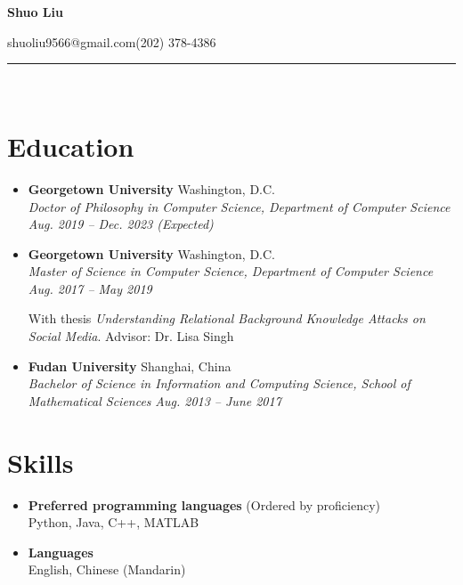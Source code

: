 \documentclass[letterpaper,11pt]{article}
\makeatletter
\newcommand{\resumeSubheading}[4]{
  \vspace{-7pt}\item
      \textbf{#1} \hfill #2 \\
      \textit{\small#3} \hfill \textit{\small #4}
  \vspace{-4pt}
}
\newcommand{\resumeSubheadingSmall}[2]{
  \vspace{-7pt}\item
      \textbf{#1} \hfill #2 \\
}
\newcommand{\resumeSubHeadingListStart}{\begin{itemize}[leftmargin=*]}
\newcommand{\resumeSubHeadingListEnd}{\end{itemize}}
\makeatother
\begin{document}
\begin{center}
\textbf{\huge Shuo Liu}

\vspace{5pt}
shuoliu9566@gmail.com\qquad (202) 378-4386

\date{\today}

\end{center}
\vspace{-15pt}
\noindent\rule{\textwidth}{1.5pt}\\
\vspace{-5pt}
\section{Education}
  \resumeSubHeadingListStart
    \resumeSubheading
      {Georgetown University}{Washington, D.C.}
      {Doctor of Philosophy in Computer Science\emph{, Department of Computer Science}}{Aug. 2019 -- Dec. 2023 (Expected)}
    \resumeSubheading
      {Georgetown University}{Washington, D.C.}
      {Master of Science in Computer Science\emph{, Department of Computer Science}}{Aug. 2017 -- May 2019}

      \begin{small}{With thesis \emph{Understanding Relational Background Knowledge Attacks on Social Media}. Advisor: Dr. Lisa Singh}\end{small}
    \resumeSubheading
      {Fudan University}{Shanghai, China}
      {Bachelor of Science in Information and Computing Science\emph{, School of Mathematical Sciences}}{Aug. 2013 -- June 2017}
  \resumeSubHeadingListEnd

\section{Skills}
  \resumeSubHeadingListStart
    \resumeSubheadingSmall
      {Preferred programming languages}{(Ordered by proficiency)}

      Python, Java, C++, MATLAB
    \resumeSubheadingSmall
      {Languages}{}

      English, Chinese (Mandarin)
  \resumeSubHeadingListEnd


\end{document}
